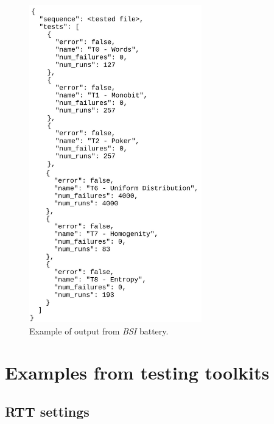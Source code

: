 \documentclass[
  digital,     %
  oneside,     %
  nosansbold,  %
  nocolorbold, %
  nolof,         %
  nolot,         %
]{fithesis4}
\begin{document}
\begin{figure}[h!]
  \begin{center}
    \includegraphics[width=7.5cm]{figures/outputs-appendix/bsi.jpg}
  \end{center}
  \caption{Example of output from \emph{BSI} battery.}
  \label{fig:bsi_example}
\end{figure}

\newpage





\chapter{Examples from testing toolkits} \label{append:rtt}

\section{RTT settings} \label{append:rtt-setting}
\end{document}
